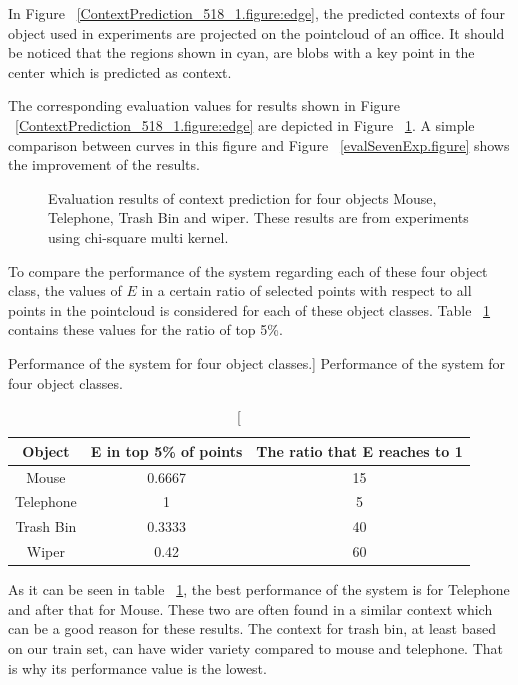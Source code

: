 In Figure ~\ref{ContextPrediction_518_1.figure:edge}, the predicted contexts of four object used in experiments 
are projected on the pointcloud of an office.
It should be noticed that the regions shown in cyan, are blobs with a key point in the center which is predicted as 
context.

The corresponding evaluation values for results shown in Figure ~\ref{ContextPrediction_518_1.figure:edge} are depicted
in Figure ~\ref{Eval_518_1.figure}.
A simple comparison between curves in this figure and Figure ~\ref{evalSevenExp.figure} shows the improvement of the 
results.

\begin{figure}
  \begin{center}
  \caption[Evaluation results for four object classes.]
  {Evaluation results of context prediction for four objects Mouse, Telephone, Trash Bin and wiper. These results are from experiments using chi-square multi kernel.}
  \label{Eval_518_1.figure}
  \end{center}
\end{figure}

To compare the performance of the system regarding each of these four object class, the values of $E$ in a certain 
ratio of selected points with respect to all points in the pointcloud is considered for each of these object classes.
Table ~\ref{performance.table} contains these values for the ratio of top 5\%.

\begin{table}
\centering
\caption
[Performance of the system for four object classes.]
{Performance of the system for four object classes.}
\label{performance.table}
\begin{tabular}{|c|c|c|}
\hline
Object & E in top 5\% of points & The ratio that E reaches to 1 \\
\hline
      Mouse & 0.6667 & 15 \\
\hline
      Telephone & 1 & 5 \\
\hline
      Trash Bin & 0.3333 &  40\\
\hline
      Wiper & 0.42 & 60 \\
\hline
\end{tabular}
\end{table}

As it can be seen in table ~\ref{performance.table}, the best performance of the system is for Telephone and after 
that for Mouse.
These two are often found in a similar context which can be a good reason for these results.
The context for trash bin, at least based on our train set, can have wider variety compared to mouse and telephone.
That is why its performance value is the lowest.


